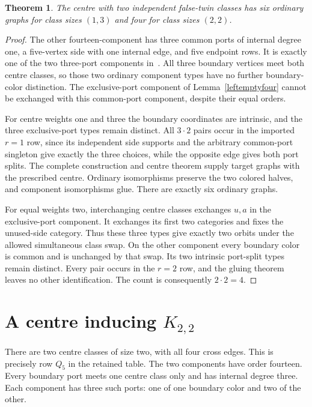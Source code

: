 \documentclass[11pt]{article}
\newtheorem{theorem}{Theorem}
\begin{document}
\begin{theorem}\label{emptyfour}
The centre with two independent false-twin classes has six ordinary
graphs for class sizes $(1,3)$ and four for class sizes $(2,2)$.
\end{theorem}
\begin{proof}
The other fourteen-component has three common ports of internal degree
one, a five-vertex side with one internal edge, and five endpoint rows.
It is exactly one of the two three-port components in~\cite{halves}.
All three boundary vertices meet both centre classes, so those two
ordinary component types have no further boundary-color distinction.
The exclusive-port component of Lemma~\ref{leftemptyfour} cannot be
exchanged with this common-port component, despite their equal orders.

For centre weights one and three the boundary coordinates are intrinsic,
and the three exclusive-port types remain distinct. All $3\cdot2$ pairs
occur in the imported $r=1$ row, since its independent side supports and
the arbitrary common-port singleton give exactly the three choices,
while the opposite edge gives both port splits. The complete construction
and centre theorem supply target graphs with the prescribed centre.
Ordinary isomorphisms preserve the two colored halves, and component
isomorphisms glue. There are exactly six ordinary graphs.

For equal weights two, interchanging centre classes exchanges $u,a$ in
the exclusive-port component. It exchanges its first two categories
and fixes the unused-side category. Thus these three types give exactly
two orbits under the allowed simultaneous class swap. On the other
component every boundary color is common and is unchanged by that swap.
Its two intrinsic port-split types remain distinct. Every pair occurs
in the $r=2$ row, and the gluing theorem leaves no other identification.
The count is consequently $2\cdot2=4$.
\end{proof}

\section{A centre inducing $K_{2,2}$}

There are two centre classes of size two, with all four cross edges.
This is precisely row $Q_5$ in the retained table. The two components
have order fourteen. Every boundary port meets one centre class only
and has internal degree three. Each component has three such ports:
one of one boundary color and two of the other.
\end{document}
